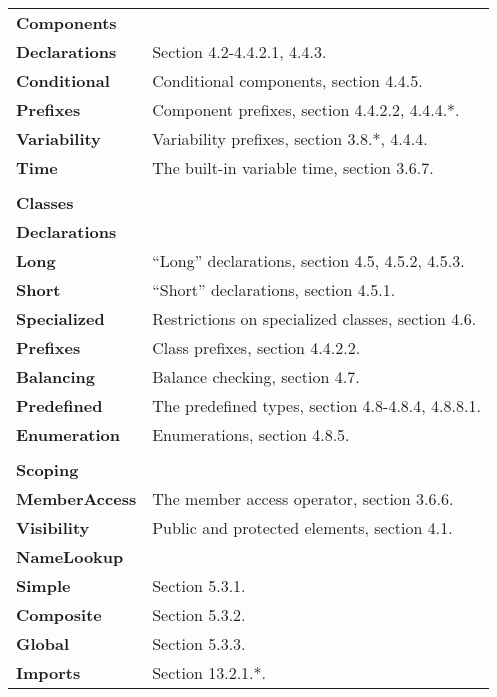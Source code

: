 \documentclass{article}
\begin{document}
\medskip
\noindent
\begin{tabular}{l l}
  \textbf{Components} \\
    \indent\textbf{Declarations}     & Section 4.2-4.4.2.1, 4.4.3. \\
    \indent\textbf{Conditional}      & Conditional components, section 4.4.5. \\
    \indent\textbf{Prefixes}         & Component prefixes, section 4.4.2.2, 4.4.4.*. \\
    \indent\textbf{Variability}      & Variability prefixes, section 3.8.*, 4.4.4. \\
    \indent\textbf{Time}             & The built-in variable time, section 3.6.7.  \\
  \\
  \textbf{Classes} \\
    \indent\textbf{Declarations} \\
    \indent\indent\textbf{Long}      & ``Long'' declarations, section 4.5, 4.5.2, 4.5.3. \\
    \indent\indent\textbf{Short}     & ``Short'' declarations, section 4.5.1. \\
    \indent\textbf{Specialized}      & Restrictions on specialized classes, section 4.6. \\
    \indent\textbf{Prefixes}         & Class prefixes, section 4.4.2.2. \\
    \indent\textbf{Balancing}        & Balance checking, section 4.7. \\
    \indent\textbf{Predefined}       & The predefined types, section 4.8-4.8.4, 4.8.8.1. \\
    \indent\textbf{Enumeration}      & Enumerations, section 4.8.5. \\
  \\
  \textbf{Scoping} \\
    \indent\textbf{MemberAccess}     & The member access operator, section 3.6.6.  \\
    \indent\textbf{Visibility}       & Public and protected elements, section 4.1. \\
    \indent\textbf{NameLookup} \\
    \indent\indent\textbf{Simple}    & Section 5.3.1. \\
    \indent\indent\textbf{Composite} & Section 5.3.2. \\
    \indent\indent\textbf{Global}    & Section 5.3.3. \\
    \indent\indent\textbf{Imports}   & Section 13.2.1.*. \\

\end{tabular}
\end{document}
